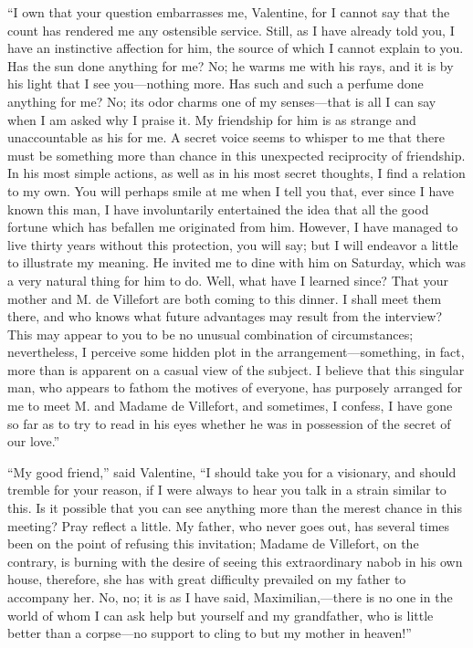 “I own that your question embarrasses me, Valentine, for I cannot say
that the count has rendered me any ostensible service. Still, as I have
already told you, I have an instinctive affection for him, the source
of which I cannot explain to you. Has the sun done anything for me? No;
he warms me with his rays, and it is by his light that I see
you—nothing more. Has such and such a perfume done anything for me? No;
its odor charms one of my senses—that is all I can say when I am asked
why I praise it. My friendship for him is as strange and unaccountable
as his for me. A secret voice seems to whisper to me that there must be
something more than chance in this unexpected reciprocity of
friendship. In his most simple actions, as well as in his most secret
thoughts, I find a relation to my own. You will perhaps smile at me
when I tell you that, ever since I have known this man, I have
involuntarily entertained the idea that all the good fortune which has
befallen me originated from him. However, I have managed to live thirty
years without this protection, you will say; but I will endeavor a
little to illustrate my meaning. He invited me to dine with him on
Saturday, which was a very natural thing for him to do. Well, what have
I learned since? That your mother and M. de Villefort are both coming
to this dinner. I shall meet them there, and who knows what future
advantages may result from the interview? This may appear to you to be
no unusual combination of circumstances; nevertheless, I perceive some
hidden plot in the arrangement—something, in fact, more than is
apparent on a casual view of the subject. I believe that this singular
man, who appears to fathom the motives of everyone, has purposely
arranged for me to meet M. and Madame de Villefort, and sometimes, I
confess, I have gone so far as to try to read in his eyes whether he
was in possession of the secret of our love.”

“My good friend,” said Valentine, “I should take you for a visionary,
and should tremble for your reason, if I were always to hear you talk
in a strain similar to this. Is it possible that you can see anything
more than the merest chance in this meeting? Pray reflect a little. My
father, who never goes out, has several times been on the point of
refusing this invitation; Madame de Villefort, on the contrary, is
burning with the desire of seeing this extraordinary nabob in his own
house, therefore, she has with great difficulty prevailed on my father
to accompany her. No, no; it is as I have said, Maximilian,—there is no
one in the world of whom I can ask help but yourself and my
grandfather, who is little better than a corpse—no support to cling to
but my mother in heaven!”

